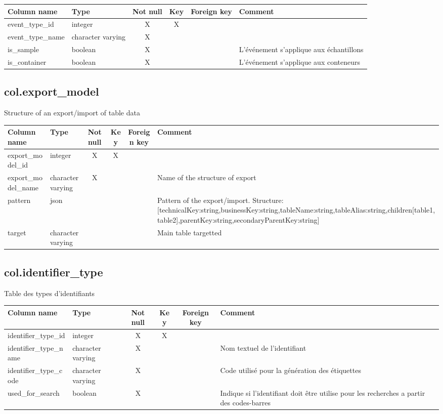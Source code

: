 \begin{tabular}{|l| p{2cm}|c|c|c| p{3cm}|}
\hline
Column name & Type & Not null & Key & Foreign key & Comment \\
\hline
event\_type\_id & integer & X & X & & \\
\hline
event\_type\_name & character varying & X & & & \\
\hline
is\_sample & boolean & X & & & L'événement s'applique aux échantillons\\
\hline
is\_container & boolean & X & & & L'événement s'applique aux conteneurs\\
\hline
\end{tabular}
\subsection{col.export\_model}
Structure of an export/import of table data

\begin{tabular}{|l| p{2cm}|c|c|c| p{3cm}|}
\hline
Column name & Type & Not null & Key & Foreign key & Comment \\
\hline
export\_model\_id & integer & X & X & & \\
\hline
export\_model\_name & character varying & X & & & Name of the structure of export\\
\hline
pattern & json & & & & Pattern of the export/import. Structure: [{technicalKey:string,businessKey:string,tableName:string,tableAlias:string,children[table1,table2],parentKey:string,secondaryParentKey:string}]\\
\hline
target & character varying & & & & Main table targetted\\
\hline
\end{tabular}
\subsection{col.identifier\_type}
Table des types d'identifiants

\begin{tabular}{|l| p{2cm}|c|c|c| p{3cm}|}
\hline
Column name & Type & Not null & Key & Foreign key & Comment \\
\hline
identifier\_type\_id & integer & X & X & & \\
\hline
identifier\_type\_name & character varying & X & & & Nom textuel de l'identifiant\\
\hline
identifier\_type\_code & character varying & X & & & Code utilisé pour la génération des étiquettes\\
\hline
used\_for\_search & boolean & X & & & Indique si l'identifiant doit être utilise pour les recherches a partir des codes-barres\\
\hline
\end{tabular}
